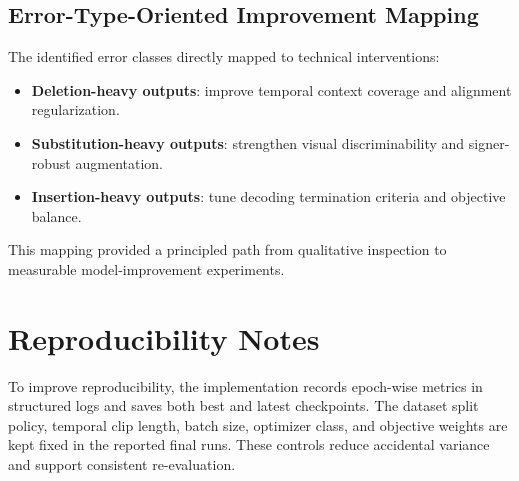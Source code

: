 \subsection{Error-Type-Oriented Improvement Mapping}

The identified error classes directly mapped to technical interventions:
\begin{itemize}
    \item \textbf{Deletion-heavy outputs}: improve temporal context coverage and alignment regularization.
    \item \textbf{Substitution-heavy outputs}: strengthen visual discriminability and signer-robust augmentation.
    \item \textbf{Insertion-heavy outputs}: tune decoding termination criteria and objective balance.
\end{itemize}

This mapping provided a principled path from qualitative inspection to measurable model-improvement experiments.

\section{Reproducibility Notes}

To improve reproducibility, the implementation records epoch-wise metrics in structured logs and saves both best and latest checkpoints. The dataset split policy, temporal clip length, batch size, optimizer class, and objective weights are kept fixed in the reported final runs. These controls reduce accidental variance and support consistent re-evaluation.
